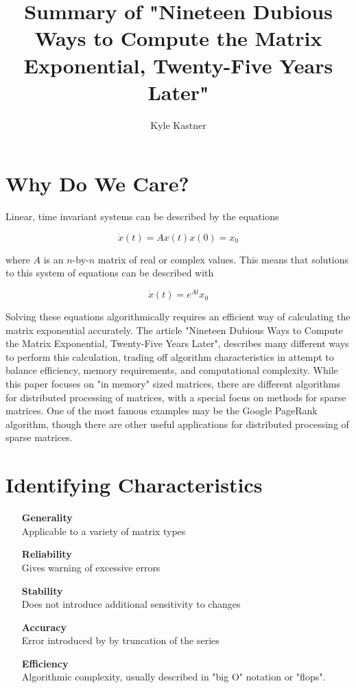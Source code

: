 \documentclass{article}
\begin{document}
\title{Summary of "Nineteen Dubious Ways to Compute the Matrix Exponential, Twenty-Five Years Later"}
\author{Kyle Kastner}

\maketitle

\section*{Why Do We Care?}
Linear, time invariant systems can be described by the equations 

\begin{equation}
\dot x(t) = Ax(t)
x(0) = x_0
\end{equation}

where $A$ is an $n$-by-$n$ matrix of real or complex values.
This means that solutions to this system of equations can be described with 

\begin{equation}
\dot x(t) = e^{At}x_0
\end{equation}

Solving these equations algorithmically requires an efficient 
way of calculating the matrix exponential accurately. 
The article "Nineteen Dubious Ways to Compute the Matrix
Exponential, Twenty-Five Years Later", describes many different 
ways to perform this calculation, trading off algorithm 
characteristics in attempt to balance efficiency, memory
requirements, and computational complexity.
\vspace*{1\baselineskip}
While this paper focuses on "in memory" sized matrices, there are 
different algorithms for distributed processing of matrices, with 
a special focus on methods for sparse matrices. One of the most 
famous examples may be the Google PageRank algorithm, though 
there are other useful applications for distributed processing of 
sparse matrices.

\section*{Identifying Characteristics}
\begin{itemize}
    \item[\bf{Generality}] \hfill \\
Applicable to a variety of matrix types
    \item[\bf{Reliability}] \hfill \\
Gives warning of excessive errors
    \item[\bf{Stability}] \hfill \\
Does not introduce additional sensitivity to changes
    \item[\bf{Accuracy}] \hfill \\
Error introduced by by truncation of the series 
    \item[\bf{Efficiency}] \hfill \\
Algorithmic complexity, usually described in "big O" notation or "flops".
\end{itemize}
\end{document}

